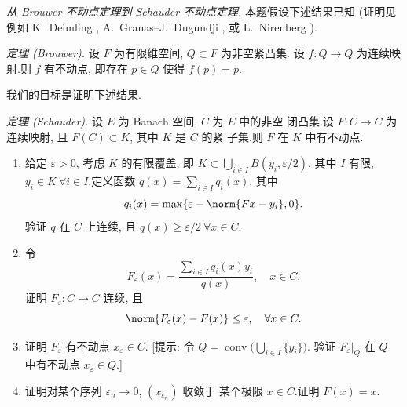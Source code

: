 \begin{exercise}
\label{exer:6.26}
\emph{从 Brouwer 不动点定理到 Schauder 不动点定理.}
本题假设下述结果已知 (证明见例如 K.~Deimling , A.~Granas--J.~Dugundji , 或
L.~Nirenberg ).

\smallskip
\noindent\emph{定理 (Brouwer).} 设 $F$ 为有限维空间, $Q\subset F$ 为非空紧凸集.
设 $f:Q\to Q$ 为连续映射.则 $f$ 有不动点, 即存在 $p\in Q$ 使得
$f(p)=p$.

\smallskip
我们的目标是证明下述结果.

\smallskip
\noindent\emph{定理 (Schauder).} 设 $E$ 为 Banach 空间, $C$ 为 $E$ 中的非空
闭凸集.设 $F:C\to C$ 为连续映射, 且 $F(C)\subset K$, 其中 $K$ 是 $C$ 的紧
子集.则 $F$ 在 $K$ 中有不动点.

\begin{enumerate}[label=\arabic*., leftmargin=2.2em, itemsep=0.3em]
	\item 给定 $\varepsilon>0$, 考虑 $K$ 的有限覆盖, 即
	      $K\subset\bigcup_{i\in I}B(y_i,\varepsilon/2)$, 其中 $I$ 有限,
	      $y_i\in K\ \forall i\in I$.定义函数
	      $q(x)=\sum_{i\in I}q_i(x)$, 其中
	      \begin{equation*}
	      q_i(x)=\max\{\varepsilon-\norm{Fx-y_i},0\}.
	      \end{equation*}
	      验证 $q$ 在 $C$ 上连续, 且 $q(x)\ge\varepsilon/2\ \forall x\in C$.
	\item 令
	      \begin{equation*}
	      F_\varepsilon(x)=\frac{\sum_{i\in I}q_i(x)y_i}{q(x)},\quad x\in C.
	      \end{equation*}
	      证明 $F_\varepsilon:C\to C$ 连续, 且
	      \begin{equation*}
	      \norm{F_\varepsilon(x)-F(x)}\le\varepsilon,\quad\forall x\in C.
	      \end{equation*}
	\item 证明 $F_\varepsilon$ 有不动点 $x_\varepsilon\in C$.
	      [提示: 令 $Q=\operatorname{conv}\bigl(\bigcup_{i\in I}\{y_i\}\bigr)$.
	      验证 $F_\varepsilon|_Q$ 在 $Q$ 中有不动点 $x_\varepsilon\in Q$.]
	\item 证明对某个序列 $\varepsilon_n\to0$, $(x_{\varepsilon_n})$ 收敛于
	      某个极限 $x\in C$.证明 $F(x)=x$.
\end{enumerate}
\end{exercise}

